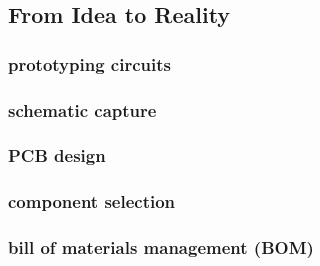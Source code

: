 \documentclass[]{journal}
\begin{document}
	\subsection{From Idea to Reality}
		\subsubsection{prototyping circuits}
		\subsubsection{schematic capture}
		\subsubsection{PCB design}
		\subsubsection{component selection}
		\subsubsection{bill of materials management (BOM)}
\end{document}
